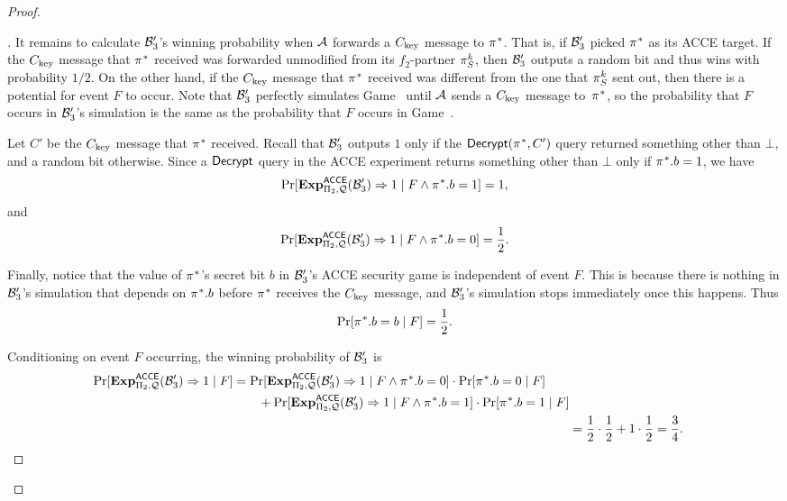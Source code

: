 \begin{proof}
\begin{proof}[]
\medskip
It remains to calculate $\A[B]'_3$'s winning probability when $\A$ forwards a $\Ckey$ message to $\oracle^*$.
That is,
if $\A[B]'_3$ picked $\oracle^*$ as its ACCE target.
If the $\Ckey$ message that $\oracle^*$ received  was forwarded unmodified from its $f_2$-partner $\oracle[S][k]$,
then $\A[B]'_3$ outputs a random bit and thus wins with probability $1 / 2$.
On the other hand,
if the $\Ckey$ message that $\oracle^*$ received was different from the one that $\oracle[S][k]$ sent out,
then there is a potential for event $F$ to occur. 
Note that $\A[B]'_3$ perfectly simulates Game~\prevgame{} until $\A$ sends a $\Ckey$ message to~$\oracle^*$,
so the probability that $F$ occurs in $\A[B]'_3$'s simulation is the same as the probability that $F$ occurs in Game~\prevgame{}.

Let $C'$ be the $\Ckey$ message that $\oracle^*$ received.
Recall that $\A[B]'_3$ outputs $1$ only if the $\Decrypt(\oracle^*, C')$ query returned something other than $\bot$,
and a random bit otherwise.
Since a $\Decrypt$ query in the ACCE experiment returns something other than $\bot$ only if $\oracle^*.b = 1$,
we have 
\begin{equation}
	\Pr[\Exp_{\protocol_2,\queryset}^{\acce}(\A[B]'_3) \Rightarrow 1 \mid F \land \oracle^*.b = 1] = 1,
\end{equation}
and 
\begin{equation}
	\Pr[\Exp_{\protocol_2,\queryset}^{\acce}(\A[B]'_3) \Rightarrow 1 \mid F \land \oracle^*.b = 0] = \frac{1}{2}.
\end{equation}

Finally,
notice that the value of $\oracle^*$'s secret bit $b$ in $\A[B]'_3$'s ACCE security game is independent of event $F$.
This is because there is nothing in $\A[B]'_3$'s simulation that depends on $\oracle^*.b$ before $\oracle^*$ receives the $\Ckey$ message,
and $\A[B]'_3$'s simulation stops immediately once this happens.
Thus 
\begin{equation}
	\Pr[\oracle^*.b = b \mid F] = \frac{1}{2} .
\end{equation}

Conditioning on event $F$ occurring, the winning probability of  $\A[B]'_3$ is
\small
\begin{align}
	\begin{split}
		\Pr[\Exp_{\protocol_2,\queryset}^{\acce}(\A[B]'_3) \Rightarrow 1 \mid F] &=
			\Pr[\Exp_{\protocol_2,\queryset}^{\acce}(\A[B]'_3) \Rightarrow 1 \mid F \land \oracle^*.b = 0] \cdot 
			\Pr[\oracle^*.b = 0 \mid F]	\\
			&\qquad + \Pr[\Exp_{\protocol_2,\queryset}^{\acce}(\A[B]'_3) \Rightarrow 1 \mid F \land \oracle^*.b = 1] \cdot 	\Pr[\oracle^*.b = 1 \mid F]
	\end{split} \\
		&= \frac{1}{2} \cdot \frac{1}{2} + 1 \cdot \frac{1}{2} = \frac{3}{4} .
\end{align}
\normalsize


\end{proof}
\end{proof}
